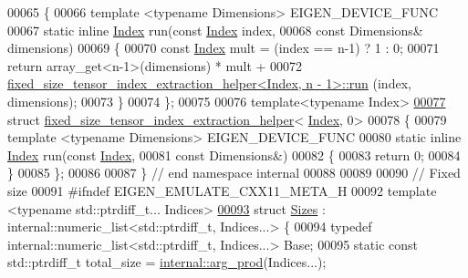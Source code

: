 \begin{DoxyCode}
00065 \{
00066   \textcolor{keyword}{template} <\textcolor{keyword}{typename} Dimensions> EIGEN\_DEVICE\_FUNC
00067   \textcolor{keyword}{static} \textcolor{keyword}{inline} \hyperlink{namespace_eigen_a62e77e0933482dafde8fe197d9a2cfde}{Index} run(\textcolor{keyword}{const} \hyperlink{namespace_eigen_a62e77e0933482dafde8fe197d9a2cfde}{Index} index,
00068                           \textcolor{keyword}{const} Dimensions& dimensions)
00069   \{
00070     \textcolor{keyword}{const} \hyperlink{namespace_eigen_a62e77e0933482dafde8fe197d9a2cfde}{Index} mult = (index == n-1) ? 1 : 0;
00071     \textcolor{keywordflow}{return} array\_get<n-1>(dimensions) * mult +
00072         \hyperlink{struct_eigen_1_1internal_1_1fixed__size__tensor__index__extraction__helper}{fixed\_size\_tensor\_index\_extraction\_helper<Index, n - 1>::run}
      (index, dimensions);
00073   \}
00074 \};
00075 
00076 \textcolor{keyword}{template}<\textcolor{keyword}{typename} Index>
\hyperlink{struct_eigen_1_1internal_1_1fixed__size__tensor__index__extraction__helper_3_01_index_00_010_01_4}{00077} \textcolor{keyword}{struct }\hyperlink{struct_eigen_1_1internal_1_1fixed__size__tensor__index__extraction__helper}{fixed\_size\_tensor\_index\_extraction\_helper}<
      \hyperlink{namespace_eigen_a62e77e0933482dafde8fe197d9a2cfde}{Index}, 0>
00078 \{
00079   \textcolor{keyword}{template} <\textcolor{keyword}{typename} Dimensions> EIGEN\_DEVICE\_FUNC
00080   \textcolor{keyword}{static} \textcolor{keyword}{inline} \hyperlink{namespace_eigen_a62e77e0933482dafde8fe197d9a2cfde}{Index} run(\textcolor{keyword}{const} \hyperlink{namespace_eigen_a62e77e0933482dafde8fe197d9a2cfde}{Index},
00081                           \textcolor{keyword}{const} Dimensions&)
00082   \{
00083     \textcolor{keywordflow}{return} 0;
00084   \}
00085   \};
00086 
00087 \}  \textcolor{comment}{// end namespace internal}
00088 
00089 
00090 \textcolor{comment}{// Fixed size}
00091 \textcolor{preprocessor}{#ifndef EIGEN\_EMULATE\_CXX11\_META\_H}
00092 \textcolor{keyword}{template} <\textcolor{keyword}{typename} std::ptrdiff\_t... Indices>
\hyperlink{struct_eigen_1_1_sizes}{00093} \textcolor{keyword}{struct }\hyperlink{struct_eigen_1_1_sizes}{Sizes} : internal::numeric\_list<std::ptrdiff\_t, Indices...> \{
00094   \textcolor{keyword}{typedef} internal::numeric\_list<std::ptrdiff\_t, Indices...> Base;
00095   \textcolor{keyword}{static} \textcolor{keyword}{const} std::ptrdiff\_t total\_size = \hyperlink{struct_eigen_1_1internal_1_1arg__prod}{internal::arg\_prod}(Indices...);

\end{DoxyCode}
